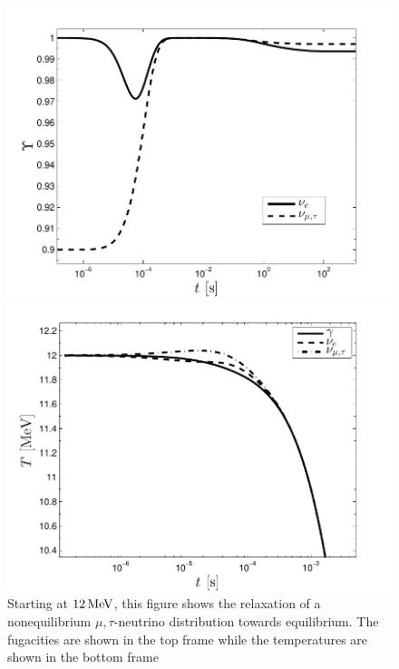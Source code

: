 \begin{figure} 
\centerline{\includegraphics[width=0.90\linewidth]{plots/Ups_relax.pdf}}
\centerline{\includegraphics[width=0.90\linewidth]{plots/T_relax.pdf}}
\caption{Starting at $12\text{\,MeV}$, this figure shows the relaxation of a nonequilibrium $\mu,\tau$-neutrino distribution towards equilibrium. The fugacities are shown in the top frame while the temperatures are shown in the bottom frame}
\label{fig:relax}
 \end{figure}

